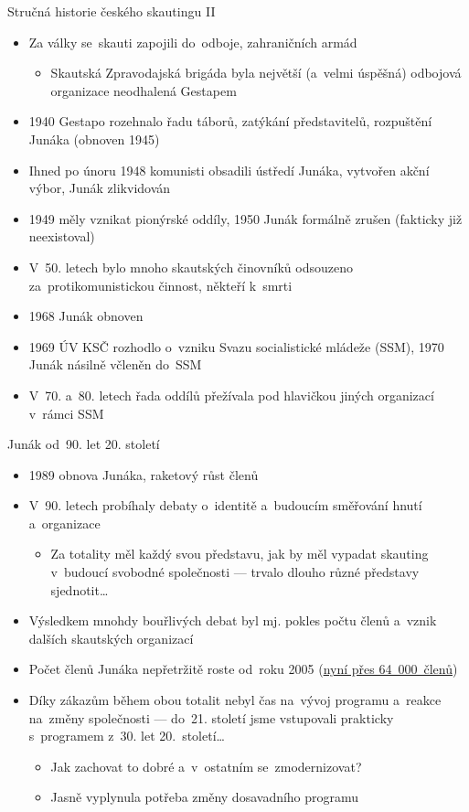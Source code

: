 \documentclass[compress, ucs, xelatex, 11pt, xcolor=dvipsnames, print,
	hyperref={
		bookmarks=true,
		unicode=true,
		colorlinks=true,
		pdftitle={Skautska vychovna metoda},
		plainpages=false,
		pdfauthor={Vojtech Zeisek},
		pdfsubject={Skautska vychovna metoda a jeji vyvoj za posledni stoleti a desetileti},
		pdfcreator={XeLaTeX},
		pdfkeywords={Junak, Pedagogika, Skaut, Skauting, Vychovna metoda},
		linkcolor=Black,
		anchorcolor=Black,
		citecolor=OliveGreen,
		filecolor=OliveGreen,
		menucolor=Black,
		urlcolor=OliveGreen,
		pdftex},
	url={hyphens, lowtilde} %
	]{beamer}
\begin{document}
\begin{frame}{Stručná historie českého skautingu II}
	\begin{itemize}
		\item Za války se~skauti zapojili do~odboje, zahraničních armád
		\begin{itemize}
			\item Skautská Zpravodajská brigáda byla největší (a~velmi úspěšná) odbojová organizace neodhalená Gestapem
		\end{itemize}
		\item 1940 Gestapo rozehnalo řadu táborů, zatýkání představitelů, rozpuštění Junáka (obnoven 1945)
		\item Ihned po únoru 1948 komunisti obsadili ústředí Junáka, vytvořen akční výbor, Junák zlikvidován
		\item 1949 měly vznikat pionýrské oddíly, 1950 Junák formálně zrušen (fakticky již neexistoval)
		\item V~50. letech bylo mnoho skautských činovníků odsouzeno za~protikomunistickou činnost, někteří k~smrti
		\item 1968 Junák obnoven
		\item 1969 ÚV KSČ rozhodlo o~vzniku Svazu socialistické mládeže (SSM), 1970 Junák násilně včleněn do~SSM
		\item V~70. a~80. letech řada oddílů přežívala pod hlavičkou jiných organizací v~rámci SSM
	\end{itemize}
\end{frame}

\begin{frame}{Junák od~90. let 20. století}
	\begin{itemize}
		\item 1989 obnova Junáka, raketový růst členů
		\item V~90. letech probíhaly debaty o~identitě a~budoucím směřování hnutí a~organizace
		\begin{itemize}
			\item Za totality měl každý svou představu, jak by měl vypadat skauting v~budoucí svobodné společnosti --- trvalo dlouho různé představy sjednotit\ldots
		\end{itemize}
		\item Výsledkem mnohdy bouřlivých debat byl mj. pokles počtu členů a~vznik dalších skautských organizací
		\item Počet členů Junáka nepřetržitě roste od~roku 2005 (\href{https://www.skaut.cz/skauting/fakta-a-cisla/}{nyní přes 64~000~členů})
		\item Díky zákazům během obou totalit nebyl čas na~vývoj programu a~reakce na~změny společnosti --- do~21. století jsme vstupovali prakticky s~programem z~30. let 20.~století\ldots
		\begin{itemize}
			\item Jak zachovat to dobré a~v~ostatním se~zmodernizovat?
			\item Jasně vyplynula potřeba změny dosavadního programu
		\end{itemize}
	\end{itemize}
\end{frame}
\end{document}
